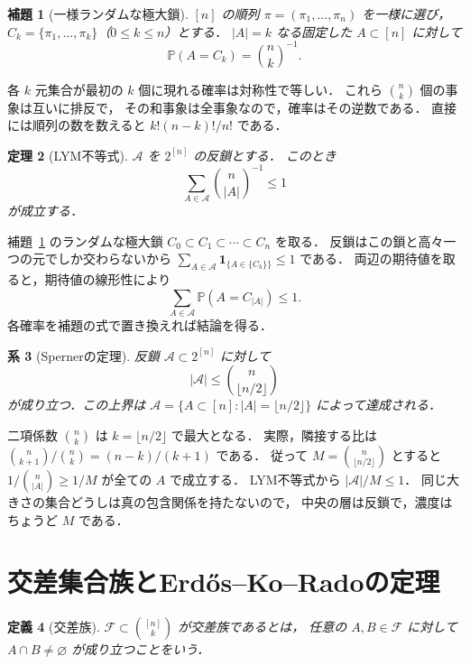 \documentclass[a5paper,10pt,onecolumn]{jsarticle}
\makeatletter
\theoremstyle{mathnotetheorem}
\newtheorem{theorem}{定理}[section]
\newtheorem{definition}[theorem]{定義}
\newtheorem{lemma}[theorem]{補題}
\newtheorem{corollary}[theorem]{系}
\renewcommand{\proofname}{証明}
\renewenvironment{proof}[1][\proofname]{%
  \par\pushQED{\qed}\normalfont\topsep4\p@\@plus2\p@\relax
  \trivlist\item[\hskip\labelsep\bfseries #1]\ignorespaces
}{\popQED\endtrivlist\@endpefalse}
\makeatother
\begin{document}
\begin{lemma}[一様ランダムな極大鎖]\label{lem:randomchain}
$[n]$ の順列 $\pi=(\pi_1,\ldots,\pi_n)$ を一様に選び，
$C_k=\{\pi_1,\ldots,\pi_k\}$（$0\le k\le n$）とする．
$|A|=k$ なる固定した $A\subset[n]$ に対して
\[
 \mathbb P(A=C_k)={n\choose k}^{-1}.
\]
\end{lemma}
\begin{proof}
各 $k$ 元集合が最初の $k$ 個に現れる確率は対称性で等しい．
これら ${n\choose k}$ 個の事象は互いに排反で，
その和事象は全事象なので，確率はその逆数である．
直接には順列の数を数えると $k!(n-k)!/n!$ である．
\end{proof}

\begin{theorem}[LYM不等式]\label{thm:lym}
$\mathcal A$ を $2^{[n]}$ の反鎖とする．
このとき
\begin{equation}\label{eq:lym}
 \sum_{A\in\mathcal A}{n\choose|A|}^{-1}\le1
\end{equation}
が成立する．
\end{theorem}
\begin{proof}
補題~\ref{lem:randomchain} のランダムな極大鎖
$C_0\subset C_1\subset\cdots\subset C_n$ を取る．
反鎖はこの鎖と高々一つの元でしか交わらないから
$\sum_{A\in\mathcal A}\mathbf1_{\{A\in\{C_k\}\}}\le1$ である．
両辺の期待値を取ると，期待値の線形性により
\[
 \sum_{A\in\mathcal A}\mathbb P(A=C_{|A|})\le1.
\]
各確率を補題の式で置き換えれば結論を得る．
\end{proof}

\begin{corollary}[Spernerの定理]\label{cor:sperner}
反鎖 $\mathcal A\subset2^{[n]}$ に対して
\[
 |\mathcal A|\le{n\choose\lfloor n/2\rfloor}
\]
が成り立つ．この上界は
$\mathcal A=\{A\subset[n]:|A|=\lfloor n/2\rfloor\}$
によって達成される．
\end{corollary}
\begin{proof}
二項係数 ${n\choose k}$ は $k=\lfloor n/2\rfloor$ で最大となる．
実際，隣接する比は
${n\choose k+1}/{n\choose k}=(n-k)/(k+1)$ である．
従って $M={n\choose\lfloor n/2\rfloor}$ とすると
$1/{n\choose|A|}\ge1/M$ が全ての $A$ で成立する．
LYM不等式から $|\mathcal A|/M\le1$．
同じ大きさの集合どうしは真の包含関係を持たないので，
中央の層は反鎖で，濃度はちょうど $M$ である．
\end{proof}

\section{交差集合族とErd\H{o}s--Ko--Radoの定理}
\begin{definition}[交差族]
$\mathcal F\subset{[n]\choose k}$ が交差族であるとは，
任意の $A,B\in\mathcal F$ に対して
$A\cap B\ne\varnothing$ が成り立つことをいう．
\end{definition}
\end{document}
